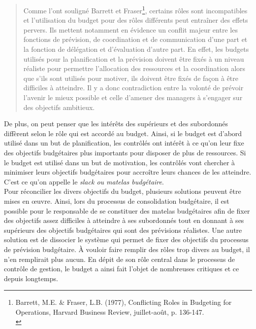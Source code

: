 \documentclass{tufte-handout}
\begin{document}
\begin{quote}
Comme l'ont souligné Barrett et Fraser\footnote{Barrett, M.E. \& Fraser, L.B. (1977), Conflicting Roles in Budgeting for Operations, Harvard Business Review, juillet-août, p. 136-147.\\}, certains rôles sont incompatibles et l'utilisation du budget pour des rôles différents peut entraîner des effets pervers. Ils mettent notamment en évidence un conflit majeur entre les fonctions de prévision, de coordination et de communication d'une part et la fonction de délégation et d'évaluation d'autre part. En effet, les budgets utilisés pour la planification et la prévision doivent être fixés à un niveau réaliste pour permettre l'allocation des ressources et la coordination alors que s'ils sont utilisés pour motiver, ils doivent être fixés de façon à être difficiles à atteindre. Il y a donc contradiction entre la volonté de prévoir l'avenir le mieux possible et celle d'amener des managers à s'engager sur des objectifs ambitieux.\\
\end{quote}

De plus, on peut penser que les intérêts des supérieurs et des subordonnés diffèrent selon le rôle qui est accordé au budget. Ainsi, si le budget est d'abord utilisé dans un but de planification, les contrôlés ont intérêt à ce qu'on leur fixe des objectifs budgétaires plus importants pour disposer de plus de ressources. Si le budget est utilisé dans un but de motivation, les contrôlés vont chercher à minimiser leurs objectifs budgétaires pour accroître leurs chances de les atteindre. C'est ce qu'on appelle le \emph{slack ou matelas budgétaire}.\\

Pour réconcilier les divers objectifs du budget, plusieurs solutions peuvent être mises en œuvre. Ainsi, lors du processus de consolidation budgétaire, il est possible pour le responsable de se constituer des matelas budgétaires afin de fixer des objectifs assez difficiles à atteindre à ses subordonnés tout en donnant à ses supérieurs des objectifs budgétaires qui sont des prévisions réalistes. Une autre solution est de dissocier le système qui permet de fixer des objectifs du processus de prévision budgétaire. À vouloir faire remplir des rôles trop divers au budget, il n'en remplirait plus aucun. En dépit de son rôle central dans le processus de contrôle de gestion, le budget a ainsi fait l'objet de nombreuses critiques et ce depuis longtemps.\\
\end{document}
